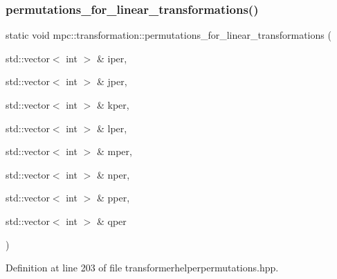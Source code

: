 \subsubsection{\texorpdfstring{permutations\+\_\+for\+\_\+linear\+\_\+transformations()}{permutations\_for\_linear\_transformations()}\hspace{0.1cm}{\footnotesize\ttfamily [8/11]}}
{\footnotesize\ttfamily static void mpc\+::transformation\+::permutations\+\_\+for\+\_\+linear\+\_\+transformations (\begin{DoxyParamCaption}\item[{std\+::vector$<$ int $>$ \&}]{iper,  }\item[{std\+::vector$<$ int $>$ \&}]{jper,  }\item[{std\+::vector$<$ int $>$ \&}]{kper,  }\item[{std\+::vector$<$ int $>$ \&}]{lper,  }\item[{std\+::vector$<$ int $>$ \&}]{mper,  }\item[{std\+::vector$<$ int $>$ \&}]{nper,  }\item[{std\+::vector$<$ int $>$ \&}]{pper,  }\item[{std\+::vector$<$ int $>$ \&}]{qper }\end{DoxyParamCaption})\hspace{0.3cm}{\ttfamily [static]}}



Definition at line 203 of file transformerhelperpermutations.\+hpp.

\mbox{\label{namespacempc_1_1transformation_a8766b836a604c8da92cb7c03db68abb4}} 
